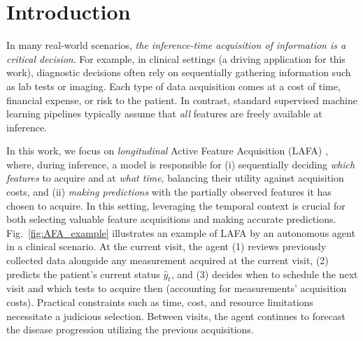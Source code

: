 \section{Introduction}
\label{intro}
In many real-world scenarios, \textit{the inference-time acquisition of information is a critical decision}. For example, in clinical settings (a driving application for this work), diagnostic decisions often rely on sequentially gathering information such as lab tests or imaging. Each type of data acquisition comes at a cost of time, financial expense, or risk to the patient. In contrast, standard supervised machine learning pipelines typically assume that \emph{all} features are freely available at inference.

In this work, we focus on \emph{longitudinal} Active Feature Acquisition (LAFA) \citep{saar2009active, kossen2022active}, where, during inference, a model is responsible for (i) sequentially deciding \emph{which features} to acquire and at \emph{what time}, balancing their utility against acquisition costs, and (ii) \emph{making predictions} with the partially observed features it has chosen to acquire.  In this setting, leveraging the temporal context is crucial for both selecting valuable feature acquisitions and making accurate predictions.
Fig.~\ref{fig:AFA_example} illustrates an example of LAFA by an autonomous agent in a clinical scenario. At the current visit, the agent 
(1) reviews previously collected data alongside any measurement acquired at the current visit, (2) predicts the patient's current status $\hat{y}_t$, and (3) decides when to schedule the next visit and which tests to acquire then (accounting for measurements' acquisition costs). Practical constraints such as time, cost, and resource limitations necessitate a judicious selection. 
Between visits, the agent continues to forecast the disease progression utilizing the previous acquisitions. 


